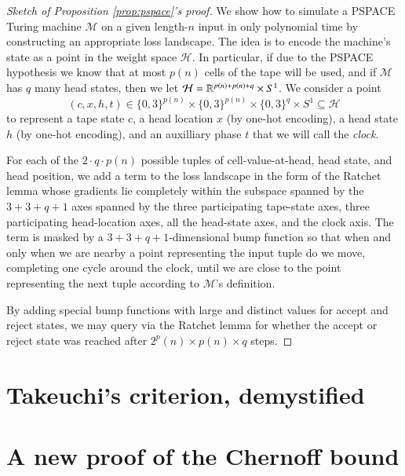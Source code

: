 \documentclass[openany, notitlepage, justified]{tufte-book}
\theoremstyle{plain}
\theoremstyle{definition}
\newcommand{\Hh}{\mathcal{H}}
\newcommand{\Mm}{\mathcal{M}}
\begin{document}
        \begin{proof}[Sketch of Proposition \ref{prop:pspace}'s proof]
            We show how to simulate a PSPACE Turing machine $\Mm$ on a given
            length-$n$ input in only polynomial time by constructing an
            appropriate loss landscape.  The idea is to encode the machine's
            state as a point in the weight space $\Hh$.  In particular, if due
            to the PSPACE hypothesis we know that at most $p(n)$ cells of
            the tape will be used, and if $\Mm$ has $q$ many head states,
            then we let $\Hh = \RR^{p(n)+p(n)+q} \times S^1$.  We consider a
            point
            $$
                (c,x,h,t)\in\{0,3\}^{p(n)}\times\{0,3\}^{p(n)}\times\{0,3\}^{q}\times S^1\subseteq \Hh
            $$
            to represent a tape state $c$, a head location $x$ (by one-hot encoding),
            a head state $h$ (by one-hot encoding), and an auxilliary phase $t$
            that we will call the \emph{clock}.

            For each of the $2 \cdot q \cdot p(n)$ possible tuples of
            cell-value-at-head, head state, and head position, we add a term
            to the loss landscape in the form of the Ratchet lemma whose 
            gradients lie completely within the subspace spanned by the
            $3+3+q+1$ axes spanned by the three participating tape-state axes,
            three participating head-location axes, all the head-state axes, 
            and the clock axis.  The term is masked by a $3+3+q+1$-dimensional
            bump function so that when and only when we are nearby a point
            representing the input tuple do we move, completing one cycle 
            around the clock, until we are close to the point representing the
            next tuple according to $\Mm$'s definition. 

            By adding special bump functions with large and distinct values for 
            accept and reject states, we may query via the Ratchet lemma for 
            whether the accept or reject state was reached after
            $2^p(n)\times p(n)\times q$ steps. 
        \end{proof}

    \section{Takeuchi's criterion, demystified} \label{appendix:tic}

    \section{A new proof of the Chernoff bound} \label{appendix:chernoff}
        
\end{document}
